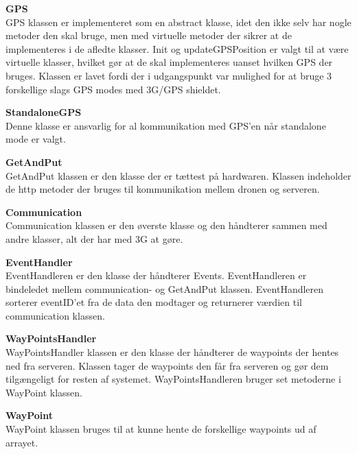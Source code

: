 \newpage

\textbf{GPS} \\
GPS klassen er implementeret som en abstract klasse, idet den ikke selv har nogle metoder den skal bruge, men med virtuelle metoder der sikrer at de implementeres i de afledte klasser. 
Init og updateGPSPosition er valgt til at være virtuelle klasser, hvilket gør at de skal implementeres uanset hvilken GPS der bruges. Klassen er lavet fordi der i udgangspunkt var mulighed for at bruge 3 forskellige slags GPS modes med 3G/GPS shieldet. 

\textbf{StandaloneGPS}\\
Denne klasse er ansvarlig for al kommunikation med GPS'en når standalone mode er valgt. 

\textbf{GetAndPut} \\
GetAndPut klassen er den klasse der er tættest på hardwaren. Klassen indeholder de http metoder der bruges til kommunikation mellem dronen og serveren. 

\textbf{Communication} \\
Communication klassen er den øverste klasse og den håndterer sammen med andre klasser, alt der har med 3G at gøre.

\textbf{EventHandler} \\
EventHandleren er den klasse der håndterer Events. EventHandleren er bindeledet mellem communication- og GetAndPut klassen. EventHandleren sorterer eventID'et fra de data den modtager og returnerer værdien til communication klassen.

\textbf{WayPointsHandler} \\
WayPointsHandler klassen er den klasse der håndterer de waypoints der hentes ned fra serveren. Klassen tager de waypoints den får fra serveren og gør dem tilgængeligt for resten af systemet. WayPointsHandleren bruger set metoderne i WayPoint klassen.

\textbf{WayPoint} \\
WayPoint klassen bruges til at kunne hente de forskellige waypoints ud af arrayet.  

\newpage


